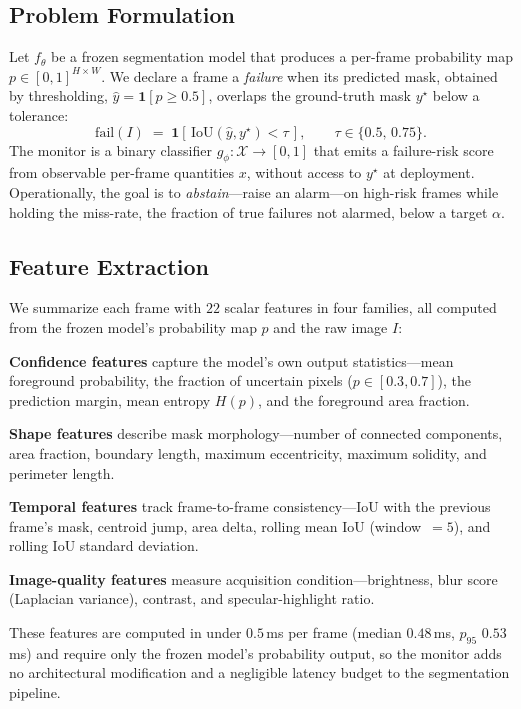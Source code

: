 \documentclass[letterpaper, 10 pt, conference]{ieeeconf}  %
\newcommand{\iou}{\mathrm{IoU}}
\begin{document}
\subsection{Problem Formulation}

Let $f_\theta$ be a frozen segmentation model that produces a per-frame
probability map $p \in [0,1]^{H \times W}$. We declare a frame a
\emph{failure} when its predicted mask, obtained by thresholding,
$\hat{y} = \mathbf{1}[p \ge 0.5]$, overlaps the ground-truth mask $y^\star$
below a tolerance:
\begin{equation}
\mathrm{fail}(I) \;=\; \mathbf{1}\!\left[\,\iou(\hat{y}, y^\star) < \tau\,\right],
\qquad \tau \in \{0.5,\,0.75\}.
\end{equation}
The monitor is a binary classifier $g_\phi : \mathcal{X} \to [0,1]$ that
emits a failure-risk score from observable per-frame quantities $x$, without
access to $y^\star$ at deployment. Operationally, the goal is to
\emph{abstain}---raise an alarm---on high-risk frames while holding the
miss-rate, the fraction of true failures not alarmed, below a target
$\alpha$.

\subsection{Feature Extraction}

We summarize each frame with $22$ scalar features in four families, all
computed from the frozen model's probability map $p$ and the raw image $I$:

\textbf{Confidence features} capture the model's own output statistics---mean
foreground probability, the fraction of uncertain pixels
($p \in [0.3, 0.7]$), the prediction margin, mean entropy $H(p)$, and the
foreground area fraction.

\textbf{Shape features} describe mask morphology---number of connected
components, area fraction, boundary length, maximum eccentricity, maximum
solidity, and perimeter length.

\textbf{Temporal features} track frame-to-frame consistency---IoU with the
previous frame's mask, centroid jump, area delta, rolling mean IoU
(window~$=5$), and rolling IoU standard deviation.

\textbf{Image-quality features} measure acquisition condition---brightness,
blur score (Laplacian variance), contrast, and specular-highlight ratio.

These features are computed in under $0.5$\,ms per frame (median
$0.48$\,ms, $p_{95}$ $0.53$\,ms) and require only the frozen model's
probability output, so the monitor adds no architectural modification and a
negligible latency budget to the segmentation pipeline.
\end{document}
